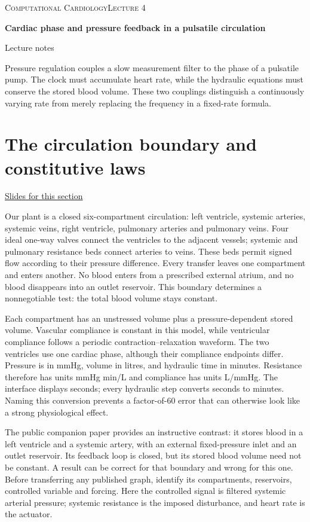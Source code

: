 \documentclass[11pt,letterpaper]{article}
\theoremstyle{definition}\newtheorem{definition}{Definition}\newtheorem{example}{Example}
\numberwithin{equation}{section}
\begin{document}
{\small\scshape Computational Cardiology\hfill Lecture 4}\par\medskip
{\raggedright{}\LARGE\bfseries\color{ink} Cardiac phase and pressure feedback in a pulsatile circulation\par}\medskip
{\small Lecture notes}\par\bigskip
Pressure regulation couples a slow measurement filter to the phase of a pulsatile pump. The clock must accumulate heart rate, while the hydraulic equations must conserve the stored blood volume. These two couplings distinguish a continuously varying rate from merely replacing the frequency in a fixed-rate formula.

\section{The circulation boundary and constitutive laws}
\hypertarget{note-the-circulation-boundary-and-constitutive-laws}{}\label{note:the-circulation-boundary-and-constitutive-laws}
{\small \href{slides.html\#frame=storage-and-boundary-conditions-figure\&step=1}{Slides for this section}}\par
Our plant is a closed six-compartment circulation: left ventricle, systemic arteries, systemic veins, right ventricle, pulmonary arteries and pulmonary veins. Four ideal one-way valves connect the ventricles to the adjacent vessels; systemic and pulmonary resistance beds connect arteries to veins. These beds permit signed flow according to their pressure difference. Every transfer leaves one compartment and enters another. No blood enters from a prescribed external atrium, and no blood disappears into an outlet reservoir. This boundary determines a nonnegotiable test: the total blood volume stays constant.

Each compartment has an unstressed volume plus a pressure-dependent stored volume. Vascular compliance is constant in this model, while ventricular compliance follows a periodic contraction--relaxation waveform. The two ventricles use one cardiac phase, although their compliance endpoints differ. Pressure is in mmHg, volume in litres, and hydraulic time in minutes. Resistance therefore has units mmHg min/L and compliance has units L/mmHg. The interface displays seconds; every hydraulic step converts seconds to minutes. Naming this conversion prevents a factor-of-60 error that can otherwise look like a strong physiological effect.

The public companion paper provides an instructive contrast: it stores blood in a left ventricle and a systemic artery, with an external fixed-pressure inlet and an outlet reservoir. Its feedback loop is closed, but its stored blood volume need not be constant. A result can be correct for that boundary and wrong for this one. Before transferring any published graph, identify its compartments, reservoirs, controlled variable and forcing. Here the controlled signal is filtered systemic arterial pressure; systemic resistance is the imposed disturbance, and heart rate is the actuator.
\end{document}
